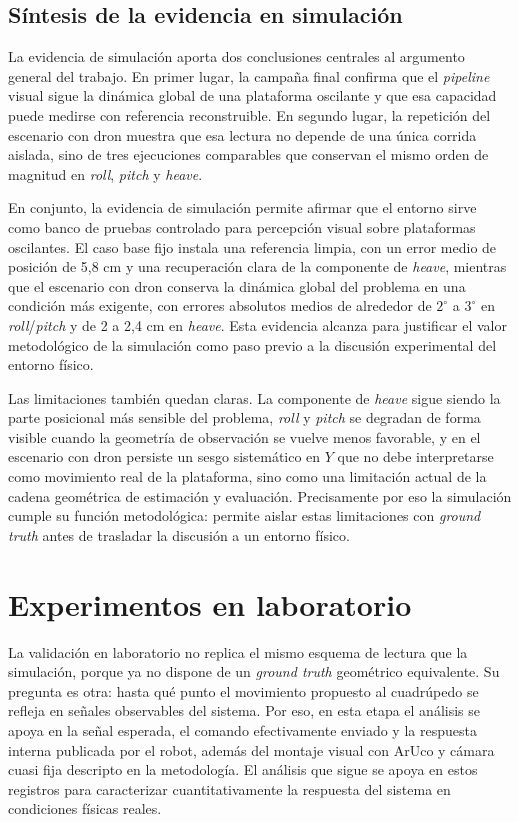 \documentclass[12pt,a4paper]{report}
\begin{document}
\subsection{Síntesis de la evidencia en simulación}

La evidencia de simulación aporta dos conclusiones centrales al argumento
general del trabajo. En primer lugar, la campaña final confirma que el \textit{pipeline}
visual sigue la dinámica global de una plataforma oscilante y que esa capacidad
puede medirse con referencia reconstruible. En segundo lugar, la repetición del
escenario con dron muestra que esa lectura no depende de una única corrida
aislada, sino de tres ejecuciones comparables que conservan el mismo orden de
magnitud en \emph{roll}, \emph{pitch} y \emph{heave}.

En conjunto, la evidencia de simulación permite afirmar que el entorno sirve
como banco de pruebas controlado para percepción visual sobre plataformas
oscilantes. El caso base fijo instala una referencia limpia, con un error medio
de posición de 5,8 cm y una recuperación clara de la componente de \emph{heave},
mientras que el escenario con dron conserva la dinámica global del problema en
una condición más exigente, con errores absolutos medios de alrededor de
\(2^\circ\) a \(3^\circ\) en \emph{roll}/\emph{pitch} y de 2 a 2,4 cm en
\emph{heave}. Esta evidencia alcanza para justificar el valor metodológico de
la simulación como paso previo a la discusión experimental del entorno físico.

Las limitaciones también quedan claras. La componente de \emph{heave} sigue siendo la
parte posicional más sensible del problema, \emph{roll} y \emph{pitch} se
degradan de forma visible cuando la geometría de observación se vuelve menos
favorable, y en el escenario con dron persiste un sesgo sistemático en
\(Y\) que no debe interpretarse como movimiento real de la plataforma, sino
como una limitación actual de la cadena geométrica de estimación y evaluación.
Precisamente por eso la simulación cumple su función metodológica: permite
aislar estas limitaciones con \textit{ground truth} antes de trasladar la discusión a un
entorno físico.

\section{Experimentos en laboratorio}
\label{sec:lab_results_anchor}

La validación en laboratorio no replica el mismo esquema de lectura que la
simulación, porque ya no dispone de un \textit{ground truth} geométrico equivalente. Su
pregunta es otra: hasta qué punto el movimiento propuesto al cuadrúpedo se
refleja en señales observables del sistema. Por eso, en esta etapa el análisis
se apoya en la señal esperada, el comando efectivamente enviado y la respuesta
interna publicada por el robot, además del montaje visual con ArUco y cámara
cuasi fija descripto en la metodología. El análisis que sigue se apoya en estos
registros para caracterizar cuantitativamente la respuesta del sistema en
condiciones físicas reales.
\end{document}
